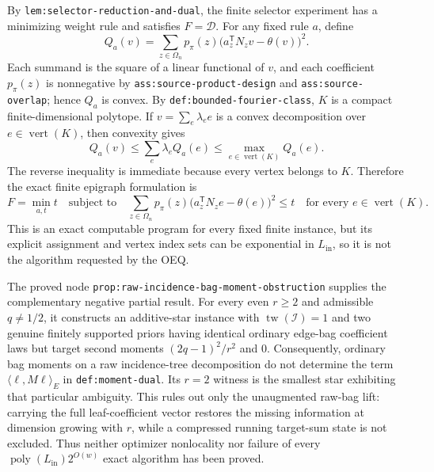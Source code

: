 By \texttt{lem:selector-reduction-and-dual}, the finite selector experiment has a minimizing weight rule and satisfies \(F=\mathcal D\).  For any fixed rule \(a\), define
\[
 Q_a(v)=\sum_{z\in\Omega_n}p_{\pi}(z)
 \bigl(a_z^{\mathsf T}N_zv-\theta(v)\bigr)^2.
\]
Each summand is the square of a linear functional of \(v\), and each coefficient \(p_{\pi}(z)\) is nonnegative by \texttt{ass:source-product-design} and \texttt{ass:source-overlap}; hence \(Q_a\) is convex.  By \texttt{def:bounded-fourier-class}, \(K\) is a compact finite-dimensional polytope.  If \(v=\sum_e\lambda_e e\) is a convex decomposition over \(e\in\operatorname{vert}(K)\), then convexity gives
\[
 Q_a(v)\le \sum_e\lambda_e Q_a(e)
 \le \max_{e\in\operatorname{vert}(K)}Q_a(e).
\]
The reverse inequality is immediate because every vertex belongs to \(K\).  Therefore the exact finite epigraph formulation is
\[
 F=\min_{a,t}t
 \quad\text{subject to}\quad
 \sum_{z\in\Omega_n}p_{\pi}(z)
 \bigl(a_z^{\mathsf T}N_ze-\theta(e)\bigr)^2\le t
 \quad\text{for every }e\in\operatorname{vert}(K).
\]
This is an exact computable program for every fixed finite instance, but its explicit assignment and vertex index sets can be exponential in \(L_{\mathrm{in}}\), so it is not the algorithm requested by the OEQ.

The proved node \texttt{prop:raw-incidence-bag-moment-obstruction} supplies the complementary negative partial result.  For every even \(r\ge2\) and admissible \(q\ne1/2\), it constructs an additive-star instance with \(\operatorname{tw}(\mathcal I)=1\) and two genuine finitely supported priors having identical ordinary edge-bag coefficient laws but target second moments \((2q-1)^2/r^2\) and \(0\).  Consequently, ordinary bag moments on a raw incidence-tree decomposition do not determine the term \(\langle\ell,M\ell\rangle_E\) in \texttt{def:moment-dual}.  Its \(r=2\) witness is the smallest star exhibiting that particular ambiguity.  This rules out only the unaugmented raw-bag lift: carrying the full leaf-coefficient vector restores the missing information at dimension growing with \(r\), while a compressed running target-sum state is not excluded.  Thus neither optimizer nonlocality nor failure of every \(\operatorname{poly}(L_{\mathrm{in}})2^{O(w)}\) exact algorithm has been proved.